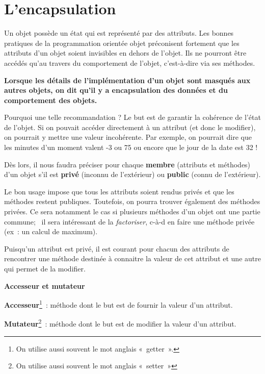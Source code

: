 \section{L'encapsulation}

Un objet possède un état qui est représenté par des attributs. Les
bonnes pratiques de la programmation orientée objet préconisent
fortement que les attributs d'un objet soient
invisibles en dehors de l'objet. Ils ne pourront être
accédés qu'au travers du comportement de
l'objet, c'est-à-dire via ses
méthodes.

{\sffamily\bfseries\upshape
{
Lorsque les détails de l'implémentation
d'un objet sont masqués aux autres objets, on dit
qu'il y a \textbf{encapsulation} des données et du
comportement des objets.}}


Pourquoi une telle recommandation ? Le but est de garantir la cohérence
de l'état de l'objet. Si on pouvait
accéder directement à un attribut (et donc le modifier), on pourrait y
mettre une valeur incohérente. Par exemple, on pourrait dire que les
minutes d'un moment valent -3 ou 75 ou encore que le
jour de la date est 32 !

Dès lors, il nous faudra préciser pour chaque \textbf{membre} (attributs
et méthodes) d'un objet s'il est
\textbf{privé} (inconnu de l'extérieur) ou
\textbf{public} (connu de l'extérieur). 

Le bon usage impose que tous les attributs soient rendus privés et que
les méthodes restent publiques. Toutefois, on pourra trouver également
des méthodes privées. Ce sera notamment le cas si plusieurs méthodes
d'un objet ont une partie commune; \ il sera
intéressant de la \textit{factoriser}, c-à-d en faire une méthode
privée (ex~: un calcul de maximum).

Puisqu'un attribut est privé, il est courant pour
chacun des attributs de rencontrer une méthode destinée à connaitre la
valeur de cet attribut et une autre qui permet de la modifier.

\clearpage
{\sffamily\bfseries\upshape
Accesseur et mutateur}

{\sffamily\bfseries\upshape
{
\textbf{Accesseur}\footnote{{On utilise aussi
souvent le mot anglais «~getter~». }}~: méthode dont le but est de
fournir la valeur d'un attribut.

\textbf{Mutateur}\footnote{{On utilise aussi
souvent le mot anglais «~setter~»}}~: méthode dont le but est de
modifier la valeur d'un attribut.}}

